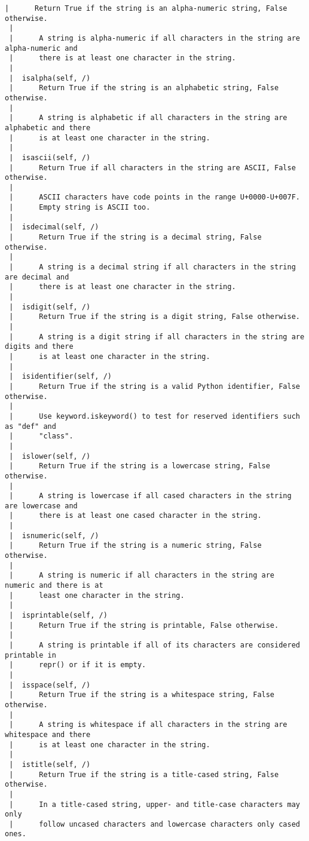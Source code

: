 \begin{Verbatim}[commandchars=\\\{\},frame=single,framerule=0.3mm,rulecolor=\color{cellframecolor}]
 |      Return True if the string is an alpha-numeric string, False otherwise.
 |      
 |      A string is alpha-numeric if all characters in the string are alpha-numeric and
 |      there is at least one character in the string.
 |  
 |  isalpha(self, /)
 |      Return True if the string is an alphabetic string, False otherwise.
 |      
 |      A string is alphabetic if all characters in the string are alphabetic and there
 |      is at least one character in the string.
 |  
 |  isascii(self, /)
 |      Return True if all characters in the string are ASCII, False otherwise.
 |      
 |      ASCII characters have code points in the range U+0000-U+007F.
 |      Empty string is ASCII too.
 |  
 |  isdecimal(self, /)
 |      Return True if the string is a decimal string, False otherwise.
 |      
 |      A string is a decimal string if all characters in the string are decimal and
 |      there is at least one character in the string.
 |  
 |  isdigit(self, /)
 |      Return True if the string is a digit string, False otherwise.
 |      
 |      A string is a digit string if all characters in the string are digits and there
 |      is at least one character in the string.
 |  
 |  isidentifier(self, /)
 |      Return True if the string is a valid Python identifier, False otherwise.
 |      
 |      Use keyword.iskeyword() to test for reserved identifiers such as "def" and
 |      "class".
 |  
 |  islower(self, /)
 |      Return True if the string is a lowercase string, False otherwise.
 |      
 |      A string is lowercase if all cased characters in the string are lowercase and
 |      there is at least one cased character in the string.
 |  
 |  isnumeric(self, /)
 |      Return True if the string is a numeric string, False otherwise.
 |      
 |      A string is numeric if all characters in the string are numeric and there is at
 |      least one character in the string.
 |  
 |  isprintable(self, /)
 |      Return True if the string is printable, False otherwise.
 |      
 |      A string is printable if all of its characters are considered printable in
 |      repr() or if it is empty.
 |  
 |  isspace(self, /)
 |      Return True if the string is a whitespace string, False otherwise.
 |      
 |      A string is whitespace if all characters in the string are whitespace and there
 |      is at least one character in the string.
 |  
 |  istitle(self, /)
 |      Return True if the string is a title-cased string, False otherwise.
 |      
 |      In a title-cased string, upper- and title-case characters may only
 |      follow uncased characters and lowercase characters only cased ones.

\end{Verbatim}
